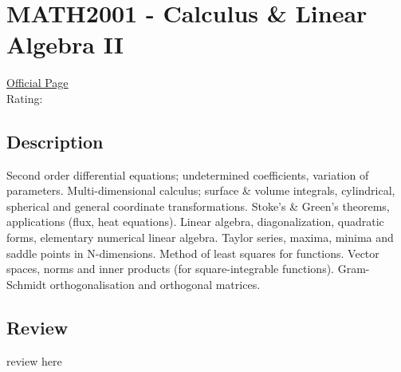 \hypertarget{MATH2001}{\section{MATH2001 - Calculus \& Linear Algebra II}}

\large
\textcolor{turbo_purple}{\href{https://my.uq.edu.au/programs-courses/course.html?course_code=MATH2001}{Official Page}} \\
Rating: \cstar\cstar\cstar\cstar\ostar

\normalsize
\subsection*{Description}
Second order differential equations; undetermined coefficients, variation of parameters.
Multi-dimensional calculus; surface \& volume integrals, cylindrical, spherical and general coordinate transformations.
Stoke's \& Green's theorems, applications (flux, heat equations).
Linear algebra, diagonalization, quadratic forms, elementary numerical linear algebra.
Taylor series, maxima, minima and saddle points in N-dimensions. Method of least squares for functions.
Vector spaces, norms and inner products (for square-integrable functions).
Gram-Schmidt orthogonalisation and orthogonal matrices.

\subsection*{Review}
review here
